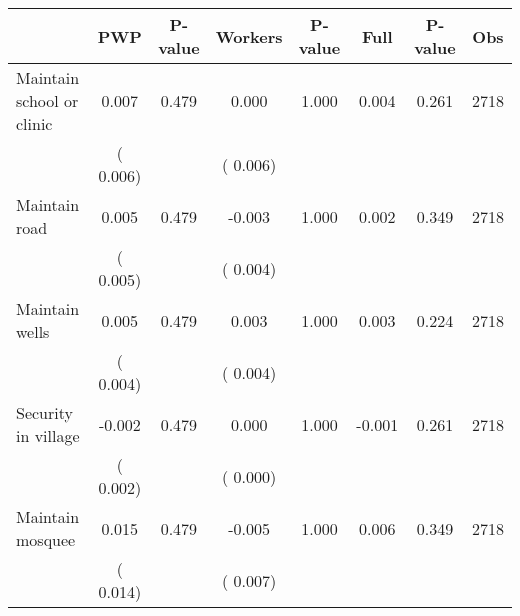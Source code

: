 
\begin{tabular}{l*{7}{c}}\hline&\multicolumn{1}{c}{PWP}&\multicolumn{1}{c}{P-value}&\multicolumn{1}{c}{Workers}&\multicolumn{1}{c}{P-value}&\multicolumn{1}{c}{Full}&\multicolumn{1}{c}{P-value}&\multicolumn{1}{c}{Obs} \\ \hline

 Maintain school or clinic       &              0.007       &        0.479  &              0.000       &        1.000  &              0.004       &              0.261 &  2718 \\ 
                       &       (       0.006)             &                               &       (       0.006)                     &                               &                                               &                                &                      \\ 

 Maintain road       &              0.005       &        0.479  &             -0.003       &        1.000  &              0.002       &              0.349 &  2718 \\ 
                       &       (       0.005)             &                               &       (       0.004)                     &                               &                                               &                                &                      \\ 

 Maintain wells       &              0.005       &        0.479  &              0.003       &        1.000  &              0.003       &              0.224 &  2718 \\ 
                       &       (       0.004)             &                               &       (       0.004)                     &                               &                                               &                                &                      \\ 

 Security in village       &             -0.002       &        0.479  &              0.000       &        1.000  &             -0.001       &              0.261 &  2718 \\ 
                       &       (       0.002)             &                               &       (       0.000)                     &                               &                                               &                                &                      \\ 

 Maintain mosquee       &              0.015       &        0.479  &             -0.005       &        1.000  &              0.006       &              0.349 &  2718 \\ 
                       &       (       0.014)             &                               &       (       0.007)                     &                               &                                               &                                &                      \\ 

\hline \end{tabular}
